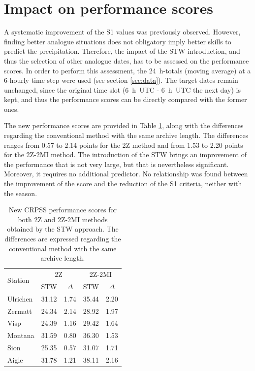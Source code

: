 \documentclass[hess]{copernicus}
\begin{document}
\section{Impact on performance scores}
\label{sec:influence_scores}

A systematic improvement of the S1 values was previously observed. However, finding better analogue situations does not obligatory imply better skills to predict the precipitation. Therefore, the impact of the STW introduction, and thus the selection of other analogue dates, has to be assessed on the performance scores. In order to perform this assessment, the 24~h-totals (moving average) at a 6-hourly time step were used (see section \ref{sec:data}). The target dates remain unchanged, since the original time slot (6~h~UTC - 6~h~UTC the next day) is kept, and thus the performance scores can be directly compared with the former ones.

The new performance scores are provided in Table \ref{table:CRPSS_STW}, along with the differences regarding the conventional method with the same archive length. The differences ranges from 0.57 to 2.14 points for the 2Z method and from 1.53 to 2.20 points for the 2Z-2MI method. The introduction of the STW brings an improvement of the performance that is not very large, but that is nevertheless significant. Moreover, it requires no additional predictor. No relationship was found between the improvement of the score and the reduction of the S1 criteria, neither with the season.

\begin{table}[htb]
	\caption{New CRPSS performance scores for both 2Z and 2Z-2MI methods obtained by the STW approach. The differences are expressed regarding the conventional method with the same archive length.}
	\begin{center}
		\begin{tabular}{l c c c c}
			\hline
			\multirow{2}{*}{Station} & \multicolumn{2}{c}{2Z} & \multicolumn{ 2}{c}{2Z-2MI} \\
			& STW & $\Delta$ & STW & $\Delta$ \\
			\hline
			Ulrichen & 31.12 & 1.74 & 35.44 & 2.20 \\
			Zermatt & 24.34 & 2.14 & 28.92 & 1.97 \\
			Visp & 24.39 & 1.16 & 29.42 & 1.64 \\
			Montana & 31.59 & 0.80 & 36.30 & 1.53 \\
			Sion & 25.35 & 0.57 & 31.07 & 1.71 \\
			Aigle & 31.78 & 1.21 & 38.11 & 2.16 \\ 
			\hline
		\end{tabular}
	\end{center}
	\label{table:CRPSS_STW}
\end{table}
\end{document}
